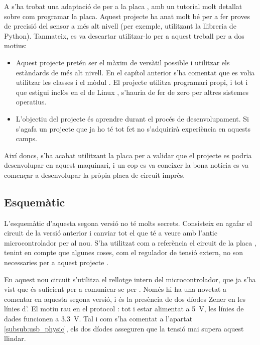 A \cite{i2cOnLittleWireBuilding} s'ha trobat una adaptació de
 per a la placa , amb un tutorial molt
detallat sobre com programar la placa.
Aquest projecte ha anat molt bé per a fer proves de precisió del sensor a més
alt nivell (per exemple, utilitzant la llibreria  de Python). Tanmateix,
es va descartar utilitzar-lo per a aquest treball per a dos motius:

\begin{itemize}
    \item Aquest projecte pretén ser el màxim de versàtil possible i utilitzar
    els estàndards de més alt nivell. En el capítol anterior s'ha comentat que
    es volia utilitzar les classes  i el mòdul . El projecte
     utilitza programari propi, i tot i que estigui inclòs
    en el  de Linux \cite{I2cTinyKernel}, s'hauria de fer de zero per altres sistemes
    operatius.
    \item L'objectiu del projecte és aprendre durant el procés de desenvolupament.
    Si s'agafa un projecte que ja ho té tot fet no s'adquirirà experiència en
    aquests camps.
\end{itemize}

Així doncs, s'ha acabat utilitzant la placa  per a validar
que el projecte es podria desenvolupar en aquest maquinari, i un cop es va
coneixer la bona notícia es va començar a desenvolupar la pròpia placa de circuit
imprès.

\subsection{Esquemàtic}

L'esquemàtic d'aquesta segona versió no té molts secrets. Consisteix en agafar
el circuit de la versió anterior i canviar tot el que té a veure amb l'antic
microcontrolador per al nou. S'ha utilitzat com a referència el circuit de la
placa , tenint en compte que algunes coses, com el regulador de
tensió extern, no son necessaries per a aquest projecte \cite{Digispark}.

En aquest nou circuit s'utilitza el rellotge intern del microcontrolador, que
ja s'ha vist que és suficient per a comunicar-se per . Només hi ha
una novetat a comentar en aquesta segona versió, i és la presència de dos
díodes Zener en les línies d'. El motiu rau en el protocol :
tot i estar alimentat a \SI[round-mode=places,round-precision=0]{5}{\volt},
les línies de dades funcionen a
\SI[round-mode=places,round-precision=1]{3.3}{\volt}. Tal i com
s'ha comentat a l'apartat \ref{subsub:usb_physic}, els dos díodes asseguren
que la tensió mai supera aquest llindar.

